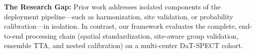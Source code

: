 \noindent\textbf{The Research Gap:} Prior work addresses isolated components of the deployment pipeline—such as harmonization, site validation, or probability calibration—in isolation. In contrast, our framework evaluates the complete, end-to-end processing chain (spatial standardization, site-aware group validation, ensemble TTA, and nested calibration) on a multi-center DaT-SPECT cohort.
